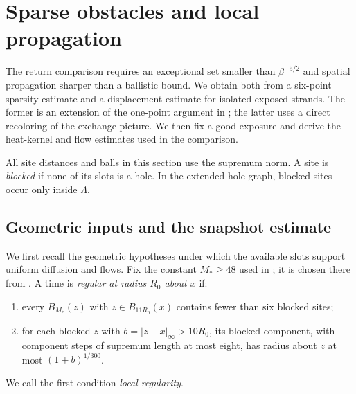 \section{Sparse obstacles and local propagation}\label{sec:geometry}

The return comparison requires an exceptional set smaller than
$\beta^{-5/2}$ and spatial propagation sharper than a ballistic bound.
We obtain both from a six-point sparsity estimate and a displacement
estimate for isolated exposed strands.  The former is an extension of
the one-point argument in \cite[Section~4]{BlochLaw}; the latter uses a
direct recoloring of the exchange picture.  We then fix a good exposure
and derive the heat-kernel and flow estimates used in the comparison.

All site distances and balls in this section use the supremum norm.
A site is \emph{blocked} if none of its slots is a hole.  In the extended
hole graph, blocked sites occur only inside $\Lambda$.

\subsection{Geometric inputs and the snapshot estimate}

We first recall the geometric hypotheses under which the available
slots support uniform diffusion and flows.  Fix the constant
$M_*\ge48$ used in \cite[Section~3]{BlochLaw}; it is chosen there from
\cite[Lemma~5.5]{Ordering}.  A time is \emph{regular at radius $R_0$
about $x$} if:
\begin{enumerate}
\item every $B_{M_*}(z)$ with $z\in B_{11R_0}(x)$ contains fewer than
six blocked sites;
\item for each blocked $z$ with $b=|z-x|_\infty>10R_0$, its blocked
component, with component steps of supremum length at most eight, has
radius about $z$ at most $(1+b)^{1/300}$.
\end{enumerate}
We call the first condition \emph{local regularity}.

